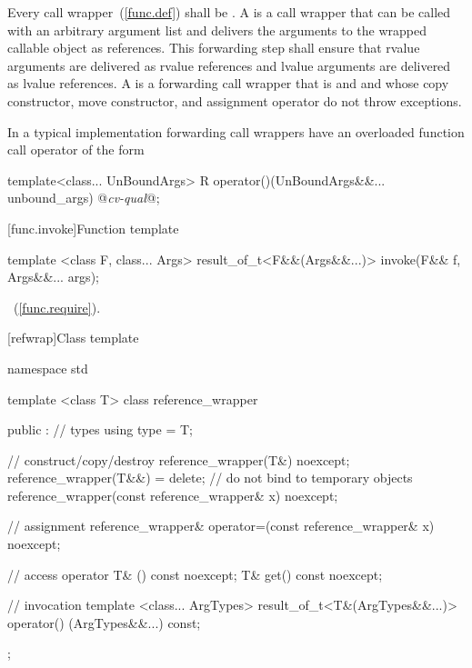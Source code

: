 \pnum
{}%
%
%
%
%
Every call wrapper~(\ref{func.def}) shall be
.
A  is a
call wrapper that can be called with an arbitrary argument list
and delivers the arguments to the wrapped callable object as references.
This forwarding step shall ensure that rvalue arguments are delivered as rvalue references
and lvalue arguments are delivered as lvalue references.
A  is a forwarding call wrapper that is
 and  and
whose copy constructor, move constructor, and assignment operator
do not throw exceptions.
\begin{note} In a typical implementation
forwarding call wrappers have an overloaded function call
operator of
the form

\begin{codeblock}
template<class... UnBoundArgs>
R operator()(UnBoundArgs&&... unbound_args) @\textit{cv-qual}@;
\end{codeblock}
\end{note}

[func.invoke]{Function template }
%
%
\begin{itemdecl}
template <class F, class... Args>
  result_of_t<F&&(Args&&...)> invoke(F&& f, Args&&... args);
\end{itemdecl}

\begin{itemdescr}
\pnum
\returns
{}~(\ref{func.require}).
\end{itemdescr}

[refwrap]{Class template }

%
%
\begin{codeblock}
namespace std {
  template <class T> class reference_wrapper {
  public :
    // types
    using type = T;

    // construct/copy/destroy
    reference_wrapper(T&) noexcept;
    reference_wrapper(T&&) = delete;     // do not bind to temporary objects
    reference_wrapper(const reference_wrapper& x) noexcept;

    // assignment
    reference_wrapper& operator=(const reference_wrapper& x) noexcept;

    // access
    operator T& () const noexcept;
    T& get() const noexcept;

    // invocation
    template <class... ArgTypes>
    result_of_t<T&(ArgTypes&&...)>
    operator() (ArgTypes&&...) const;
  };
}
\end{codeblock}


